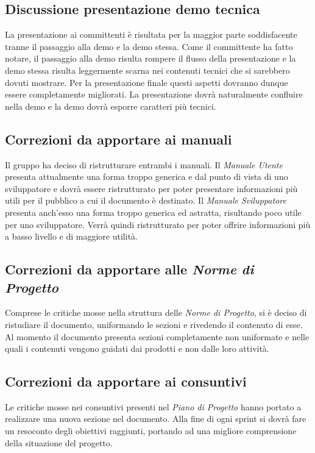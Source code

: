 \subsection{Discussione presentazione demo tecnica}
La presentazione ai committenti è risultata per la maggior parte soddisfacente tranne il passaggio alla demo e la demo stessa. Come il committente ha fatto notare, il passaggio alla demo risulta rompere il flusso della presentazione e la demo stessa risulta leggermente scarna nei contenuti tecnici che si sarebbero dovuti mostrare. \newline{} Per la presentazione finale questi aspetti dovranno dunque essere completamente migliorati. La presentazione dovrà naturalmente confluire nella demo e la demo dovrà esporre caratteri più tecnici.

\subsection{Correzioni da apportare ai manuali}
Il gruppo ha deciso di ristrutturare entrambi i manuali. Il \textit{Manuale Utente} presenta attualmente una forma troppo generica e dal punto di vista di uno sviluppatore e dovrà essere ristrutturato per poter presentare informazioni più utili per il pubblico a cui il documento è destinato. \newline{}
Il \textit{Manuale Sviluppatore} presenta anch'esso una forma troppo generica ed astratta, risultando poco utile per uno sviluppatore. Verrà quindi ristrutturato per poter offrire informazioni più a basso livello e di maggiore utilità.

\subsection{Correzioni da apportare alle \textit{Norme di Progetto}}
Comprese le critiche mosse nella struttura delle \textit{Norme di Progetto}, si è deciso di ristudiare il documento, uniformando le sezioni e rivedendo il contenuto di esse. Al momento il documento presenta sezioni completamente non uniformate e nelle quali i contenuti vengono guidati dai prodotti e non dalle loro attività.

\subsection{Correzioni da apportare ai consuntivi}
Le critiche mosse nei consuntivi presenti nel \textit{Piano di Progetto} hanno portato a realizzare una nuova sezione nel documento. Alla fine di ogni sprint si dovrà fare un resoconto degli obiettivi raggiunti, portando ad una migliore comprensione della situazione del progetto.



